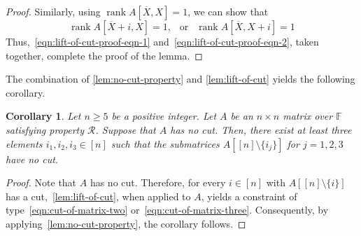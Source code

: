 \documentclass[11pt,letterpaper]{article}
\DeclareMathOperator*{\rank}{rank}
\newcommand{\comp}[1]{\overline{#1}}
\newcommand{\F}{\mathbb{F}}
\newtheorem{corollary}{Corollary}[section]
\newcommand{\nsubset}[1]{[n]\setminus\{#1\}}
\newcommand{\prop}{\mathcal{R}}
\begin{document}
{{{\begin{proof}
Similarly, using $\rank A[\comp{X}, X]=1$, we can show that 
\begin{equation}
\label{eqn:lift-of-cut-proof-eqn-2}
\rank A[\comp{X}+i, X]=1,\ \ \text{ or }\ \ \rank A[\comp{X}, X+i]=1
\end{equation}
Thus,~\cref{eqn:lift-of-cut-proof-eqn-1} and~\cref{eqn:lift-of-cut-proof-eqn-2}, taken together, complete the proof of the lemma. 
\end{proof}

The combination of \cref{lem:no-cut-property} and \cref{lem:lift-of-cut} yields the following corollary.


\begin{corollary}
\label{cor:no-cut-from-big-to-small-matrix}
Let $n\geq 5$ be a positive integer. Let $A$ be an $n\times n$ matrix over $\F$ satisfying property $\prop$. Suppose that $A$ has no cut. Then, there exist at least three elements $i_1, i_2, i_3\in[n]$ such that the submatrices $A[\nsubset{i_j}]$ for $j=1,2,3$ have no cut. 
\end{corollary}
\begin{proof}
Note that $A$ has no cut. Therefore, for every $i\in [n]$ with $A[\nsubset{i}]$ has a cut,~\cref{lem:lift-of-cut}, when applied to $A$, yields a constraint of type~\cref{eqn:cut-of-matrix-two} or~\cref{eqn:cut-of-matrix-three}. Consequently, by applying~\cref{lem:no-cut-property}, the corollary follows.
\end{proof}

}}}
\end{document}
